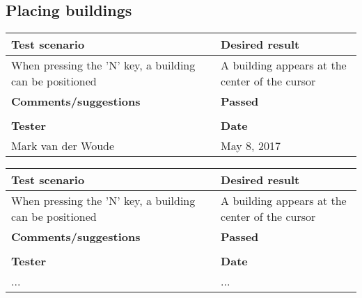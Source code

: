 \subsection{Placing buildings}

\begin{tabularx}{\textwidth}{|X|X|}
\hline
\textbf{Test scenario} & \textbf{Desired result}       
\\\hline
When pressing the 'N' key, a building can be positioned &
A building appears at the center of the cursor           
\\\hline
\textbf{Comments/suggestions} & \textbf{Passed}
\\\hline
 & \cellcolor{green}                       
\\\hline
\textbf{Tester} & \textbf{Date}               
\\\hline
Mark van der Woude & May 8, 2017                               		 
\\\hline
\end{tabularx}

\begin{tabularx}{\textwidth}{|X|X|}
\hline
\textbf{Test scenario} & \textbf{Desired result}       
\\\hline
When pressing the 'N' key, a building can be positioned &
A building appears at the center of the cursor           
\\\hline
\textbf{Comments/suggestions} & \textbf{Passed}
\\\hline
& \cellcolor{red}                         \\ \hline
\textbf{Tester} & \textbf{Date}               
\\\hline
... & ...                               		 
\\\hline
\end{tabularx}